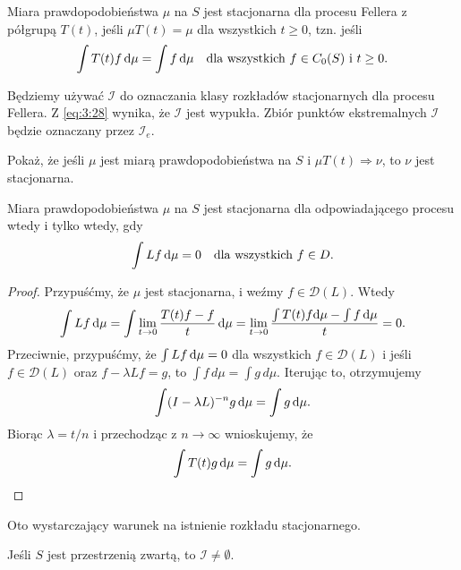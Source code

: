 \documentclass{article}
\begin{document}
	\begin{defn}
		Miara prawdopodobieństwa $\mu$ na $S$ jest stacjonarna dla procesu Fellera z półgrupą $T(t)$, 
		jeśli $\mu T(t) = \mu$ dla wszystkich $t \geq 0$, tzn. jeśli
		\begin{equation}\label{eq:3:28}
			\int T(t)f \, \mathrm{d}\mu 
			= \int f \, \mathrm{d}\mu 
			\quad \text{dla wszystkich} 
			\ f \in C_0(S) \ \text{i} \ t \geq 0.
		\end{equation}
	\end{defn}

	Będziemy używać $\mathcal{I}$ do oznaczania klasy rozkładów stacjonarnych dla procesu Fellera. 
	Z \eqref{eq:3:28} wynika, że $\mathcal{I}$ jest wypukła. 
	Zbiór punktów ekstremalnych $\mathcal{I}$ będzie oznaczany przez $\mathcal{I}_e$.

	\begin{zad}
		Pokaż, że jeśli $\mu$ jest miarą prawdopodobieństwa na $S$ 
		i $\mu T(t) \Rightarrow \nu$, to $\nu$ jest stacjonarna. 
	\end{zad}

	\begin{thm}
		Miara prawdopodobieństwa $\mu$ na $S$ jest stacjonarna 
		dla odpowiadającego procesu wtedy i tylko wtedy, gdy
		\[
			\int Lf \, \mathrm{d}\mu = 0 \quad \text{dla wszystkich} \ f \in D.
		\]
	\end{thm}

	\begin{proof}
		Przypuśćmy, że $\mu$ jest stacjonarna, i weźmy $f \in \mathcal{D}(L)$. Wtedy
		\[
			\int Lf \, \mathrm{d}\mu 
			= \int \lim_{t \to 0} \frac{T(t)f - f}{t} \, \mathrm{d}\mu 
			= \lim_{t \to 0}  \frac{\int T(t)f \mathrm{d}\mu - \int f \, \mathrm{d}\mu}{t} = 0.
		\]
		Przeciwnie, przypuśćmy, że 
		$\int Lf \, \mathrm{d}\mu = 0$ dla wszystkich $f \in \mathcal{D}(L)$ 
		i jeśli $f \in \mathcal{D}(L)$ oraz $f - \lambda Lf = g$, to $\int f \, d\mu = \int g \, d\mu$. 
		Iterując to, otrzymujemy
		\[
			\int (I - \lambda L)^{-n}g \, \mathrm{d}\mu = \int g \, \mathrm{d}\mu.
		\]
		Biorąc $\lambda = t/n$ i przechodząc z $n \to \infty$ wnioskujemy, że 
		\[
			\int T(t)g \, \mathrm{d}\mu = \int g \, \mathrm{d}\mu.
		\]
	\end{proof}

	Oto wystarczający warunek na istnienie rozkładu stacjonarnego.

	\begin{thm}
		Jeśli $S$ jest przestrzenią zwartą, to $\mathcal{I} \neq \emptyset$.
	\end{thm}
\end{document}
